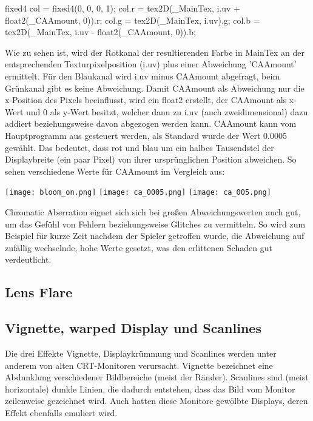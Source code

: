 \begin{hlsl}
    fixed4 col = fixed4(0, 0, 0, 1);
    col.r = tex2D(_MainTex, i.uv + float2(_CAAmount, 0)).r;
    col.g = tex2D(_MainTex, i.uv).g;
    col.b = tex2D(_MainTex, i.uv - float2(_CAAmount, 0)).b;
\end{hlsl}

Wie zu sehen ist, wird der Rotkanal der resultierenden Farbe in MainTex an der entsprechenden Texturpixelposition (i.uv) plus einer Abweichung 'CAAmount' ermittelt. Für den Blaukanal wird i.uv minus CAAmount abgefragt, beim Grünkanal gibt es keine Abweichung. Damit CAAmount als Abweichung nur die x-Position des Pixels beeinflusst, wird ein float2 erstellt, der CAAmount als x-Wert und 0 als y-Wert besitzt, welcher dann zu i.uv (auch zweidimensional) dazu addiert beziehungsweise davon abgezogen werden kann.
CAAmount kann vom Hauptprogramm aus gesteuert werden, als Standard wurde der Wert 0.0005 gewählt. Das bedeutet, dass rot und blau um ein halbes Tausendstel der Displaybreite (ein paar Pixel) von ihrer ursprünglichen Position abweichen. So sehen verschiedene Werte für CAAmount im Vergleich aus:

\captionsetup{type=figure}
\texttt{[image: bloom\_on.png]}
\texttt{[image: ca\_0005.png]}
\texttt{[image: ca\_005.png]}

Chromatic Aberration eignet sich sich bei gro{\ss}en Abweichungswerten auch gut, um das Gefühl von Fehlern beziehungsweise Glitches zu vermitteln. So wird zum Beispiel für kurze Zeit nachdem der Spieler getroffen wurde, die Abweichung auf zufällig wechselnde, hohe Werte gesetzt, was den erlittenen Schaden gut verdeutlicht.



\subsection{Lens Flare}

\lipsum[3]



\subsection{Vignette, warped Display und Scanlines}

Die drei Effekte Vignette, Displaykrümmung und Scanlines werden unter anderem von alten CRT-Monitoren verursacht. Vignette bezeichnet eine Abdunklung verschiedener Bildbereiche (meist der Ränder). Scanlines sind (meist horizontale) dunkle Linien, die dadurch entstehen, dass das Bild vom Monitor zeilenweise gezeichnet wird. Auch hatten diese Monitore gewölbte Displays, deren Effekt ebenfalls emuliert wird.

